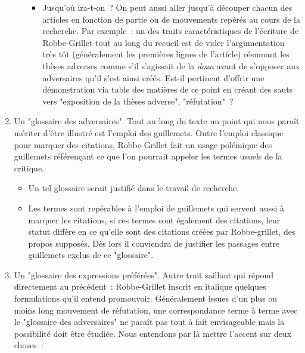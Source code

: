 \documentclass[12pt, a4paper]{article}
\begin{document}
\begin{enumerate}
\begin{enumerate}
        \begin{itemize}
            \item Jusqu'où ira-t-on~? On peut aussi aller jusqu'à découper chacun des articles en fonction de partie ou de mouvements repérés au cours de la recherche. Par exemple~: un des traits caractéristiques de l'écriture de Robbe-Grillet tout au long du recueil est de vider l'argumentation très tôt (généralement les premières lignes de l'article) résumant les thèses adverses comme s'il s'agissait de la \textit{doxa} avant de s'opposer aux adversaires qu'il s'est ainsi créés. Est-il pertinent d'offrir une démonstration via table des matières de ce point en créant des sauts vers "exposition de la thèses adverse", "réfutation"~? 
        \end{itemize}
        
    \end{enumerate}
    \label{gloss}
    \item Un "glossaire des adversaires". Tout au long du texte un point qui nous paraît mériter d'être illustré est l'emploi des guillemets. Outre l'emploi classique pour marquer des citations, Robbe-Grillet fait un usage polémique des guillemets référençant ce que l'on pourrait appeler les termes usuels de la critique. 
    \begin{itemize}
        \item Un tel glossaire serait justifié dans le travail de recherche.
        \item Les termes sont repérables à l'emploi de guillemets qui servent aussi à marquer les citations, si ces termes sont également des citations, leur statut diffère en ce qu'elle sont des citations créées par Robbe-grillet, des propos supposés. Dès lors il conviendra de justifier les passages entre guillemets exclus de ce "glossaire".
    \end{itemize}
    \item Un "glossaire des expressions préférées". Autre trait saillant qui répond directement au précédent~: Robbe-Grillet inscrit en italique quelques formulations qu'il entend promouvoir. Généralement issues d'un plus ou moins long mouvement de réfutation, une correspondance terme à terme avec le "glossaire des adversaires" ne paraît pas tout à fait envisageable mais la possibilité doit être étudiée. Nous entendons par là mettre l'accent sur deux choses~:

\end{enumerate}
\end{document}
